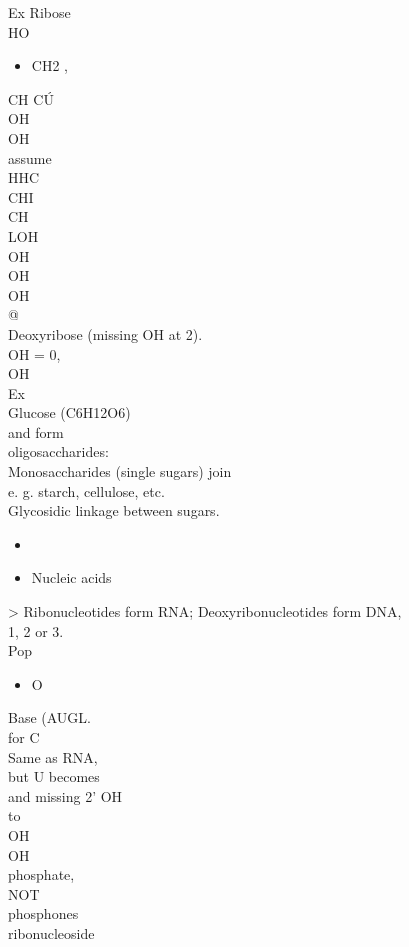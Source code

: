 \documentclass{article}
\begin{document}
Ex Ribose\\
HO\begin{itemize}\item CH2 ,
\end{itemize}
CH CÚ\\
OH\\
OH\\
assume\\
HHC\\
CHI\\
CH\\
LOH\\
OH\\
OH\\
OH\\
@\\
Deoxyribose (missing OH at 2).\\
OH = 0,\\
OH\\
Ex\\
Glucose (C6H12O6)\\
and form\\
oligosaccharides:\\
Monosaccharides (single sugars) join\\
e. g. starch, cellulose, etc.\\
Glycosidic linkage between sugars.\\
\begin{itemize}\item 
\end{itemize}
\begin{itemize}\item  Nucleic acids
\end{itemize}
> Ribonucleotides form RNA; Deoxyribonucleotides form DNA,\\
1, 2 or 3.\\
Pop \begin{itemize}\item  O
\end{itemize}
Base (AUGL.\\
for C\\
Same as RNA,\\
but U becomes\\
and missing 2' OH\\
to\\
OH\\
OH\\
phosphate,\\
NOT\\
phosphones\\
ribonucleoside\\
\end{document}
